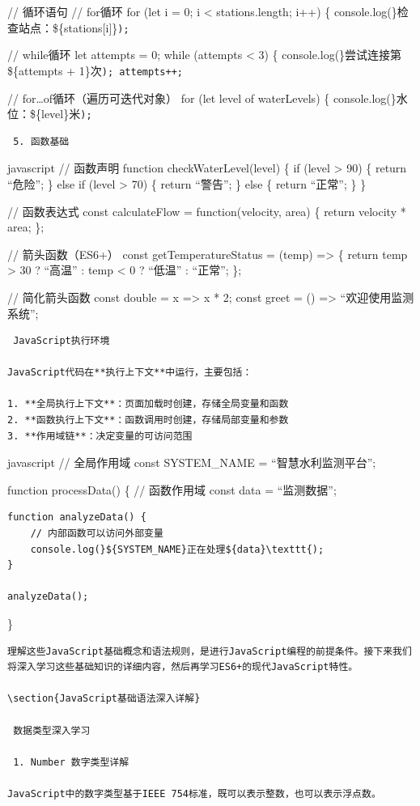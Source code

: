 // 循环语句 // for循环 for (let i = 0; i \textless{} stations.length; i++) \{ console.log(\}检查站点：\$\{stations{[}i{]}\}\texttt{);
}

// while循环 let attempts = 0; while (attempts \textless{} 3) \{ console.log(\}尝试连接第\$\{attempts + 1\}次\texttt{);
    attempts++;
}

// for\ldots of循环（遍历可迭代对象） for (let level of waterLevels) \{ console.log(\}水位：\$\{level\}米\texttt{);
}

\begin{lstlisting}
 5. 函数基础
\end{lstlisting}

javascript // 函数声明 function checkWaterLevel(level) \{ if (level \textgreater{} 90) \{ return ``危险''; \} else if (level \textgreater{} 70) \{ return ``警告''; \} else \{ return ``正常''; \} \}

// 函数表达式 const calculateFlow = function(velocity, area) \{ return velocity * area; \};

// 箭头函数（ES6+） const getTemperatureStatus = (temp) =\textgreater{} \{ return temp \textgreater{} 30 ? ``高温'' : temp \textless{} 0 ? ``低温'' : ``正常''; \};

// 简化箭头函数 const double = x =\textgreater{} x * 2; const greet = () =\textgreater{} ``欢迎使用监测系统'';

\begin{lstlisting}
 JavaScript执行环境

JavaScript代码在**执行上下文**中运行，主要包括：

1. **全局执行上下文**：页面加载时创建，存储全局变量和函数
2. **函数执行上下文**：函数调用时创建，存储局部变量和参数
3. **作用域链**：决定变量的可访问范围
\end{lstlisting}

javascript // 全局作用域 const SYSTEM\_NAME = ``智慧水利监测平台'';

function processData() \{ // 函数作用域 const data = ``监测数据'';

\begin{verbatim}
function analyzeData() {
    // 内部函数可以访问外部变量
    console.log(}${SYSTEM_NAME}正在处理${data}\texttt{);
}

analyzeData();
\end{verbatim}

\}

\begin{lstlisting}
理解这些JavaScript基础概念和语法规则，是进行JavaScript编程的前提条件。接下来我们将深入学习这些基础知识的详细内容，然后再学习ES6+的现代JavaScript特性。

\section{JavaScript基础语法深入详解}

 数据类型深入学习

 1. Number 数字类型详解

JavaScript中的数字类型基于IEEE 754标准，既可以表示整数，也可以表示浮点数。
\end{lstlisting}


